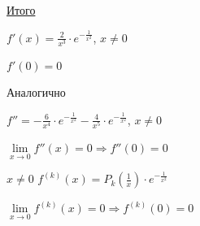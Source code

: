 \documentclass{article}
\begin{document}
			\underline{Итого}
			
			$f'(x) = \frac{2}{x^3} \cdot e^{-\frac{1}{x^2}}$, $x \neq 0$
			
			$f'(0) = 0$
			
			Аналогично
			
			$f'' = -\frac{6}{x^4} \cdot e^{-\frac{1}{x^2}} - \frac{4}{x^5} \cdot e^{-\frac{1}{x^2}}$, $x \neq 0$
			
			$\lim\limits_{x \rightarrow 0} f''(x) = 0 \Rightarrow f''(0) = 0$
			
			$x \neq 0$ $f^{(k)} (x) = P_k (\frac{1}{x}) \cdot e^{-\frac{1}{x^2}}$
			
			$\lim\limits_{x \rightarrow 0} f^{(k)}(x) = 0 \Rightarrow f^{(k)}(0) = 0$
			
			
\end{document}
